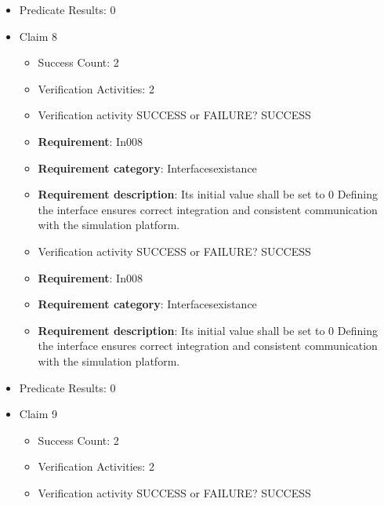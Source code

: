 \documentclass{article}
\begin{document}
\begin{itemize}
\begin{itemize}
					\item Verification activity SUCCESS or FAILURE? SUCCESS
		
						\item \textbf{Requirement}: In007 
						\item \textbf{Requirement category}: Interfacesexistance 
						\item \textbf{Requirement description}: Its initial value shall be set to 0 Defining the interface ensures correct integration and consistent communication with the simulation platform.
					
				\end{itemize}
				
									    
				\item Predicate Results: 0

  				  \item Claim 8
				\begin{itemize}
			    	\item Success Count: 2 
			    	\item Verification Activities: 2
					\item Verification activity SUCCESS or FAILURE? SUCCESS
		
						\item \textbf{Requirement}: In008 
						\item \textbf{Requirement category}: Interfacesexistance 
						\item \textbf{Requirement description}: Its initial value shall be set to 0 Defining the interface ensures correct integration and consistent communication with the simulation platform.
					
					\item Verification activity SUCCESS or FAILURE? SUCCESS
		
						\item \textbf{Requirement}: In008 
						\item \textbf{Requirement category}: Interfacesexistance 
						\item \textbf{Requirement description}: Its initial value shall be set to 0 Defining the interface ensures correct integration and consistent communication with the simulation platform.
					
				\end{itemize}
				
									    
				\item Predicate Results: 0

  				  \item Claim 9
				\begin{itemize}
			    	\item Success Count: 2 
			    	\item Verification Activities: 2
					\item Verification activity SUCCESS or FAILURE? SUCCESS
		

\end{itemize}
\end{itemize}
\end{document}
